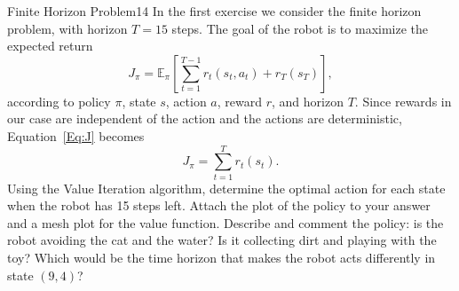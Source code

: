 \begin{questions}

\begin{question}{Finite Horizon Problem}{14}
In the first exercise we consider the finite horizon problem, with horizon $T=15$ steps.
The goal of the robot is to maximize the expected return 
\begin{equation}
J_\pi = \mathbb{E}_\pi\left[\sum_{t=1}^{T-1}r_t(s_t,a_t)+r_T(s_T)\right], \label{Eq:J}
\end{equation}
according to policy $\pi$, state $s$, action $a$, reward $r$, and horizon $T$. Since rewards in our case are independent of the action and the actions are deterministic, Equation~\eqref{Eq:J} becomes
\begin{equation}
J_\pi = \sum_{t=1}^{T}r_t(s_t).
\end{equation}
Using the Value Iteration algorithm, determine the optimal action for each state when the robot has 15 steps left. Attach the plot of the policy to your answer and a mesh plot for the value function. Describe and comment the policy: is the robot avoiding the cat and the water? Is it collecting dirt and playing with the toy? Which would be the time horizon that makes the robot acts differently in state $(9,4)$?


\end{question}
\end{questions}
